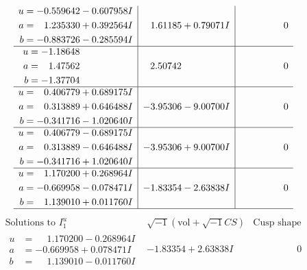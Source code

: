 \documentclass[1p]{elsarticle_modified}
\theoremstyle{definition}
\newcommand{\I}{\sqrt{-1}}
\begin{document}
$$\begin{array}{c|c|c}
\begin{aligned}
u &= -0.559642 - 0.607958 I \\
a &= \phantom{-}1.235330 + 0.392564 I \\
b &= -0.883726 - 0.285594 I\end{aligned}
 & \phantom{-}1.61185 + 0.79071 I & \phantom{-0.000000 } 0 \\ \hline\begin{aligned}
u &= -1.18648\phantom{ +0.000000I} \\
a &= \phantom{-}1.47562\phantom{ +0.000000I} \\
b &= -1.37704\phantom{ +0.000000I}\end{aligned}
 & \phantom{-}2.50742\phantom{ +0.000000I} & \phantom{-0.000000 } 0 \\ \hline\begin{aligned}
u &= \phantom{-}0.406779 + 0.689175 I \\
a &= \phantom{-}0.313889 + 0.646488 I \\
b &= -0.341716 - 1.020640 I\end{aligned}
 & -3.95306 - 9.00700 I & \phantom{-0.000000 } 0 \\ \hline\begin{aligned}
u &= \phantom{-}0.406779 - 0.689175 I \\
a &= \phantom{-}0.313889 - 0.646488 I \\
b &= -0.341716 + 1.020640 I\end{aligned}
 & -3.95306 + 9.00700 I & \phantom{-0.000000 } 0 \\ \hline\begin{aligned}
u &= \phantom{-}1.170200 + 0.268964 I \\
a &= -0.669958 - 0.078471 I \\
b &= \phantom{-}1.139010 + 0.011760 I\end{aligned}
 & -1.83354 - 2.63838 I & \phantom{-0.000000 } 0\\
 \hline 
 \end{array}$$\newpage$$\begin{array}{c|c|c}  
\text{Solutions to }I^u_{1}& \I (\text{vol} + \sqrt{-1}CS) & \text{Cusp shape}\\
 \hline 
\begin{aligned}
u &= \phantom{-}1.170200 - 0.268964 I \\
a &= -0.669958 + 0.078471 I \\
b &= \phantom{-}1.139010 - 0.011760 I\end{aligned}
 & -1.83354 + 2.63838 I & \phantom{-0.000000 } 0 \\ \hline\begin{aligned}

\end{aligned}
\end{array}$$
\end{document}
